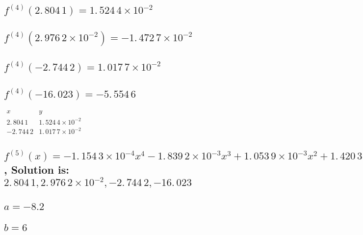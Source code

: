 \documentclass{article}
\begin{document}
\subsection{\protect\bigskip $f^{(4)}(2.\,\allowbreak 804\,1)=\allowbreak
1.\,\allowbreak 524\,4\times 10^{-2}$}

\subsection{$f^{(4)}(2.\,\allowbreak 976\,2\times 10^{-2})=\allowbreak
-1.\,\allowbreak 472\,7\times 10^{-2}$}

\subsection{$f^{(4)}(-\allowbreak 2.\,\allowbreak 744\,2)=\allowbreak
1.\,\allowbreak 017\,7\times 10^{-2}$}

\subsection{$f^{(4)}(-16.\,\allowbreak 023\allowbreak )=\allowbreak
-5.\,\allowbreak 554\,6$}

$%
\begin{array}{cc}
x & y \\ 
2.\,\allowbreak 804\,1 & 1.\,\allowbreak 524\,4\times 10^{-2} \\ 
-\allowbreak 2.\,\allowbreak 744\,2 & \allowbreak 1.\,\allowbreak
017\,7\times 10^{-2}%
\end{array}%
$

\subsection{$f^{(5)}(x)=\allowbreak -1.\,\allowbreak 154\,3\times
10^{-4}x^{4}-1.\,\allowbreak 839\,2\times 10^{-3}x^{3}+\allowbreak
1.\,\allowbreak 053\,9\times 10^{-3}x^{2}+1.\,\allowbreak 420\,3\times
10^{-2}x-4.\,\allowbreak 236\times 10^{-4}\allowbreak =0$, Solution is: $%
2.\,\allowbreak 804\,1,2.\,\allowbreak 976\,2\times 10^{-2},-\allowbreak
2.\,\allowbreak 744\,2,-16.\,\allowbreak 023\allowbreak $}

\subsection{$a=-8.2$}

\subsection{$b=6$}
\end{document}

